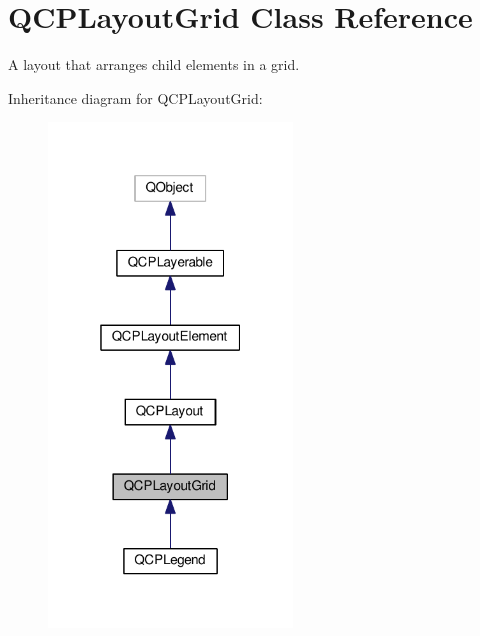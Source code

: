 \hypertarget{classQCPLayoutGrid}{}\section{Q\+C\+P\+Layout\+Grid Class Reference}
\label{classQCPLayoutGrid}


A layout that arranges child elements in a grid.  




Inheritance diagram for Q\+C\+P\+Layout\+Grid\+:
\nopagebreak
\begin{figure}[H]
\begin{center}
\leavevmode
\includegraphics[width=184pt]{classQCPLayoutGrid__inherit__graph}
\end{center}
\end{figure}


